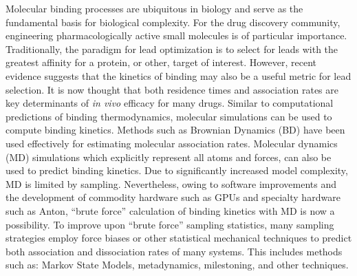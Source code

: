  

\par Molecular binding processes are ubiquitous in biology and serve as the 
fundamental basis for biological complexity. %
For the drug discovery community, engineering pharmacologically active small molecules is of 
particular importance. Traditionally, the paradigm for lead optimization is to 
select for leads with the greatest affinity for a protein, or other, target of 
interest. However, recent evidence suggests that the kinetics of binding may 
also be a useful metric for lead selection. It is now thought that both residence 
times and association rates are key determinants of \textit{in vivo} efficacy 
for many drugs\cite{Schuetz2017,Lu2010a,Copeland2006b,Copeland2016,Swinney2004b}. 
Similar to computational predictions of binding thermodynamics, molecular 
simulations can be used to compute binding kinetics\cite{DeVivo2016,Amaro2018,Bruce2018a}. Methods such as Brownian 
Dynamics (BD) have been used effectively for estimating molecular
association rates\cite{Northrup1984,McCammon1986,Zhou1990,Huber2010}. 
Molecular dynamics (MD) simulations 
which explicitly represent all atoms and forces, can also be used to predict 
binding kinetics. Due to significantly increased model complexity, MD is 
limited by sampling. Nevertheless, owing to software improvements and the 
development of commodity hardware such as GPUs and specialty hardware such as 
Anton\cite{Shaw2009,Shaw2014}, ``brute force'' calculation of binding kinetics with MD is now 
a possibility\cite{Shan2011,Shan2012,Dror2011,Pan2013a,Tang2017}. To improve 
upon ``brute force'' sampling statistics, many sampling strategies 
employ force biases or other statistical mechanical techniques to predict
both association and dissociation rates of many systems. This includes methods 
such as: Markov State Models\cite{Buch2011b,Plattner2015a,Wu2016,Doerr2014},
metadynamics\cite{Mollica2016a,Tiwary2015,Casasnovas2017}, 
milestoning\cite{Elber2017,Ma2017,Kirmizialtin2012,Yu2015,Bucci2016,Ma2015,Ma2017}, 
and other techniques\cite{Teo2016,Dickson2016,Dickson2017,Lotz2018a,Chiu2016,Wong2018,Tran2018}.

